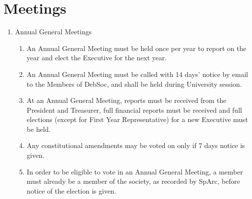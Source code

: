 \newpage
\section{Meetings}

\begin{enumerate}
\item Annual General Meetings
  \begin{enumerate}
  \item An Annual General Meeting must be held once per year to report on the year and elect the Executive for the next year.
  \item An Annual General Meeting must be called with 14 days’ notice by email to the Members of DebSoc, and shall be held during University session. \label{agm_notice_proc}
  \item At an Annual General Meeting, reports must be received from the President and Treasurer, full financial reports must be received and full elections (except for First Year Representative) for a new Executive must be held.
  \item Any constitutional amendments may be voted on only if 7 days notice is given.
  \item In order to be eligible to vote in an Annual General Meeting, a member must already be a member of the society, as recorded by SpArc, before notice of the election is given.
  \end{enumerate}


\end{enumerate}
